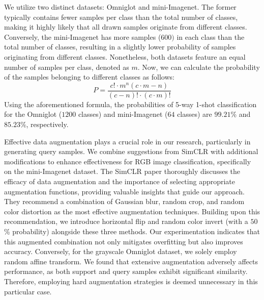 We utilize two distinct datasets: Omniglot and mini-Imagenet. The former typically contains fewer samples per class than the total number of classes, making it highly likely that all drawn samples originate from different classes. Conversely, the mini-Imagenet has more samples (\(600)\) in each class than the total number of classes, resulting in a slightly lower probability of samples originating from different classes. Nonetheless, both datasets feature an equal number of samples per class, denoted as \(m\). Now, we can calculate the probability of the samples belonging to different classes as follows:
\begin{equation}
    P=\frac{c!\cdot m^{n}(c\cdot m-n)}{(c-n)!\cdot (c\cdot m)!}
\end{equation}
\noindent Using the aforementioned formula, the probabilities of 5-way 1-shot classification for the Omniglot (\(1200\) classes) and mini-Imagenet (\(64\) classes) are \(99.21\)\% and \(85.23\)\%, respectively.

Effective data augmentation plays a crucial role in our research, particularly in generating query samples. We combine suggestions from SimCLR \cite{chen2020simple} with additional modifications to enhance effectiveness for RGB image classification, specifically on the mini-Imagenet dataset. The SimCLR paper thoroughly discusses the efficacy of data augmentation and the importance of selecting appropriate augmentation functions, providing valuable insights that guide our approach. They recommend a combination of Gaussian blur, random crop, and random color distortion as the most effective augmentation techniques. Building upon this recommendation, we introduce horizontal flip and random color invert (with a \(50\)\% probability) alongside these three methods. Our experimentation indicates that this augmented combination not only mitigates overfitting but also improves accuracy. Conversely, for the grayscale Omniglot dataset, we solely employ random affine transform. We found that extensive augmentation adversely affects performance, as both support and query samples exhibit significant similarity. Therefore, employing hard augmentation strategies is deemed unnecessary in this particular case.

